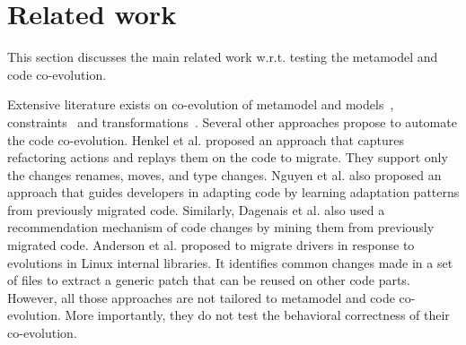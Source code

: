\section{Related work}
\label{sec_relatedwork}


This section discusses the main related work w.r.t. testing the metamodel and code co-evolution.

Extensive literature exists on co-evolution of metamodel and models~\cite{kessentini2020interactive,kessentini2018integrating,kessentini2019automated,cicchetti2008automating,herrmannsdoerfer2009cope,garces2009managing,wachsmuth2007metamodel, paige2016evolving,hebig2016approaches,demuth2016co}, constraints~\cite{cherfa2021identifying,batot2017heuristic,khelladi2016metamodel,khelladi2017semi,correa2007refactoring,kusel2015systematic} and transformations~\cite{kessentini2018automated,khelladi2018change,garces2014adapting,garcia2013model,kusel2015consistent}. 
Several other approaches propose to automate the code co-evolution. Henkel et al. \cite{henkel2005catchup} proposed an approach that captures refactoring actions and replays them on the code to migrate. They support only the changes renames, moves, and type changes. 
%
Nguyen et al. \cite{nguyen2010graph} also proposed an approach that guides developers in adapting code by learning adaptation patterns from previously migrated code. Similarly, Dagenais et al. \cite{dagenais2011recommending} also used a recommendation mechanism of code changes by mining them from previously migrated code. 
%
Anderson et al. \cite{andersen2010generic} proposed to migrate drivers in response to evolutions in Linux internal libraries. It identifies common changes made in a set of files to extract a generic patch that can be reused on other code parts. 
However, all those approaches are not tailored to metamodel and code co-evolution. More importantly, they do not test the behavioral correctness of their co-evolution. 

